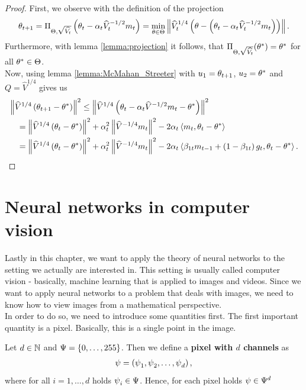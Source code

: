 \begin{proof}
First, we observe with the definition of the projection
\begin{align*}
\t_{t+1} = \Pi_{\T, \sqrt{\hat{V_t}}} \left(\t_t - \a_t \hat{V}_t^{-1/2}m_t \right) = \min_{\t \in \T} \left\|\hat{V}_t^{1/4} \left( \t -  \left(\t_t - \a_t \hat{V}_t^{-1/2}m_t \right) \right) \right\|.
\end{align*}
Furthermore, with lemma \ref{lemma:projection} it follows, that $\Pi_{\T, \sqrt{\hat{V_t}}}(\t^{\ast}) = \t^{\ast}$ for all $\t^{\ast}\in\T$.\\
Now, using lemma \ref{lemma:McMahan_Streeter} with $u_1 = \t_{t+1}$, $u_2= \t^{\ast}$ and $Q=\hat{V}^{1/4}$ gives us
\begin{align*}
&\left\| \hat{V}^{1/4}\left(\t_{t+1} - \t^{\ast} \right) \right\|^2 \leq  \left\| \hat{V}^{1/4} \left( \t_t -\a_t\hat{V}^{-1/2}m_t - \t^{\ast}\right)\right\|^2\\
&\quad = \left\| \hat{V}^{1/4} \left( \t_t - \t^{\ast} \right) \right\|^2 + \a_t^2 \left\| \hat{V}^{-1/4} m_t \right\|^2 - 2\a_t \left\langle m_t, \t_t - \t^{\ast} \right\rangle\\
&\quad = \left\| \hat{V}^{1/4} \left( \t_t - \t^{\ast} \right) \right\|^2 + \a_t^2 \left\| \hat{V}^{-1/4} m_t \right\|^2 - 2\a_t \left\langle \b_{1t}m_{t-1} + \left(1-\b_{1t}\right)g_t, \t_t - \t^{\ast} \right\rangle.
\end{align*}
\end{proof}

\section{Neural networks in computer vision}

Lastly in this chapter, we want to apply the theory of neural networks to the setting we actually are interested in. This setting is usually called computer vision - basically, machine learning that is applied to images and videos. Since we want to apply neural networks to a problem that deals with images, we need to know how to view images from a mathematical perspective.\\
In order to do so, we need to introduce some quantities first. The first important quantity is a pixel. Basically, this is a single point in the image.


\begin{definition}\label{def:pixel}
Let $d\in\N$ and $\P=\{0,\ldots,255\}$. Then we define a \textbf{pixel with $d$ channels} as
\begin{align*}
\p = \left(\p_1, \p_2,\ldots, \p_d\right),
\end{align*}
where for all $i=1,\ldots,d$ holds $\p_i\in\P$. Hence, for each pixel holds $\p\in\P^d$
\end{definition}


